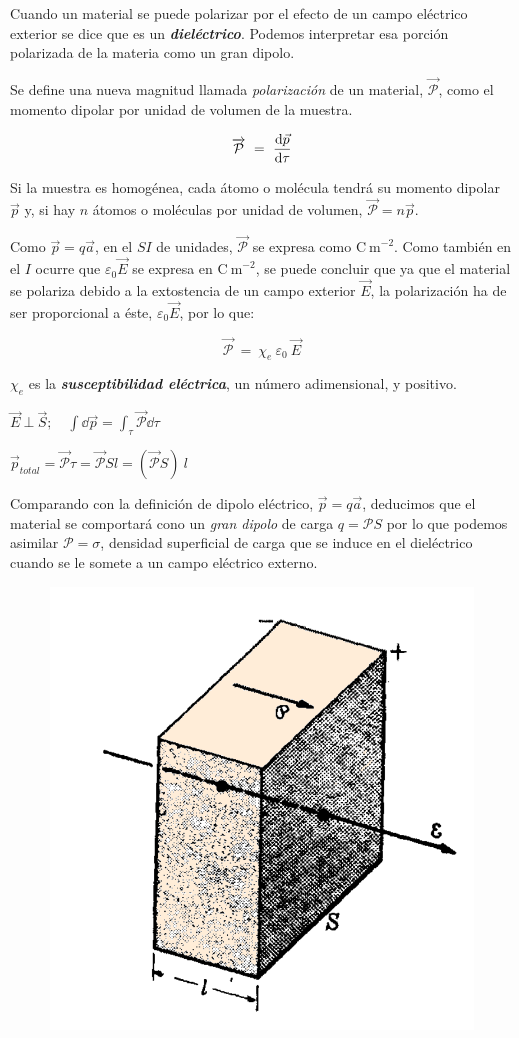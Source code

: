 Cuando un material se puede polarizar por el efecto de un campo eléctrico exterior se dice que es un \emph{\textbf{dieléctrico}}. Podemos interpretar esa porción polarizada de la materia como un gran dipolo.

Se define una nueva magnitud llamada \emph{polarización} de un material, $\overrightarrow{\mathcal P}$, como el momento dipolar por unidad de volumen de la muestra.

\begin{equation}
	\overrightarrow{\mathcal P} \ = \ \dv{\vec p}{\tau}
\end{equation}

Si la muestra es homogénea, cada átomo o molécula tendrá su momento dipolar $\vec p$ y, si hay $n$ átomos o moléculas por unidad de volumen, $\overrightarrow{\mathcal P}=n\vec p$.

Como $\vec p=q\vec a$, en el $SI$ de unidades, $\overrightarrow{\mathcal P}$ se expresa como $\mathrm{C\ m}^{-2}$. Como también en el $I$ ocurre que $\varepsilon_0 \vec E$ se expresa en $\mathrm{C\ m}^{-2}$, se puede concluir que ya que el material se polariza debido a la extostencia de un campo exterior $\vec E$, la polarización ha de ser proporcional a éste, $\varepsilon_0 \vec E$, por lo que:

\begin{equation}
	\overrightarrow{\mathcal P}\ = \ \chi_e \ \varepsilon_0 \ \vec E
\end{equation}

$\chi_e$ es la \emph{\textbf{susceptibilidad eléctrica}}, un número adimensional, y positivo.

\begin{multicols}{2}
$\vec E \ \bot \ \vec S; \quad \displaystyle \int \dd \vec p = \int_\tau \overrightarrow{\mathcal P} \dd \tau$

$\vec p_{total}=\overrightarrow{\mathcal P} \tau=\overrightarrow{\mathcal P} S l=(\overrightarrow{\mathcal P} S)\ l$

Comparando con la definición de dipolo eléctrico, $\vec p=q\vec a$,
deducimos que el material se comportará cono un \emph{gran dipolo} de carga $q=\mathcal P S$ por lo que podemos asimilar $\mathcal P=\sigma$, densidad superficial de carga que se induce en el dieléctrico cuando se le somete a un campo eléctrico externo.

\begin{figure}[H]
	\centering
	\includegraphics[width=.4\textwidth]{imagenes/imagenes24/T24IM08.png}
\end{figure}
\end{multicols}


